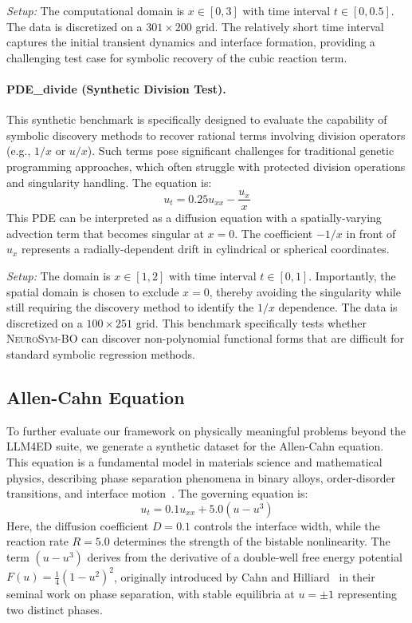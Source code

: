 \textit{Setup:} The computational domain is $x \in [0, 3]$ with time interval $t \in [0, 0.5]$. The data is discretized on a $301 \times 200$ grid. The relatively short time interval captures the initial transient dynamics and interface formation, providing a challenging test case for symbolic recovery of the cubic reaction term.

\paragraph{PDE\_divide (Synthetic Division Test).} 
This synthetic benchmark is specifically designed to evaluate the capability of symbolic discovery methods to recover rational terms involving division operators (e.g., $1/x$ or $u/x$). Such terms pose significant challenges for traditional genetic programming approaches, which often struggle with protected division operations and singularity handling. The equation is:
\begin{equation}
    u_t = 0.25 u_{xx} - \frac{u_x}{x}
\end{equation}
This PDE can be interpreted as a diffusion equation with a spatially-varying advection term that becomes singular at $x=0$. The coefficient $-1/x$ in front of $u_x$ represents a radially-dependent drift in cylindrical or spherical coordinates.

\textit{Setup:} The domain is $x \in [1, 2]$ with time interval $t \in [0, 1]$. Importantly, the spatial domain is chosen to exclude $x=0$, thereby avoiding the singularity while still requiring the discovery method to identify the $1/x$ dependence. The data is discretized on a $100 \times 251$ grid. This benchmark specifically tests whether \textsc{NeuroSym-BO} can discover non-polynomial functional forms that are difficult for standard symbolic regression methods.

\subsection{Allen-Cahn Equation}

To further evaluate our framework on physically meaningful problems beyond the LLM4ED suite, we generate a synthetic dataset for the Allen-Cahn equation. This equation is a fundamental model in materials science and mathematical physics, describing phase separation phenomena in binary alloys, order-disorder transitions, and interface motion~\cite{allen1979microscopic}. The governing equation is:
\begin{equation}
    u_t = 0.1 u_{xx} + 5.0 (u - u^3)
\end{equation}
Here, the diffusion coefficient $D = 0.1$ controls the interface width, while the reaction rate $R = 5.0$ determines the strength of the bistable nonlinearity. The term $(u - u^3)$ derives from the derivative of a double-well free energy potential $F(u) = \frac{1}{4}(1-u^2)^2$, originally introduced by Cahn and Hilliard~\cite{cahn1958free} in their seminal work on phase separation, with stable equilibria at $u = \pm 1$ representing two distinct phases.

